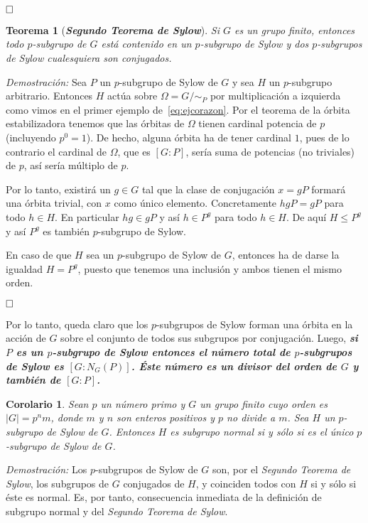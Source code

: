 \documentclass[12pt]{article}
\newtheorem{theorem}{Teorema}[section]
\newtheorem{corolario}{Corolario}[theorem]
\begin{document}
$\hfill \square$

\begin{theorem}[\textbf{\textit{Segundo Teorema de Sylow}}]Si $G$ es un grupo finito, entonces todo $p$-subgrupo de $G$ está contenido en un $p$-subgrupo de Sylow y dos $p$-subgrupos de Sylow cualesquiera son conjugados.

\end{theorem}
\emph{Demostración: }Sea $P$ un $p$-subgrupo de Sylow de $G$ y sea $H$ un $p$-subgrupo arbitrario. Entonces $H$ actúa sobre $\Omega= G/\sim_{P}$ por multiplicación a izquierda como vimos en el primer ejemplo de~\ref{eq:ejcorazon}. Por el teorema de la órbita estabilizadora tenemos que las órbitas de $\Omega$ tienen cardinal potencia de $p$ (incluyendo $p^{0}=1$). De hecho, alguna órbita ha de tener cardinal $1$, pues de lo contrario el cardinal de $\Omega$, que es $[G:P]$, sería suma de potencias (no triviales) de $p$, así sería múltiplo de $p$.

Por lo tanto, existirá un $g \in G$ tal que la clase de conjugación $x = gP$ formará una órbita trivial, con $x$ como único elemento. Concretamente $hgP = gP$ para todo $h \in H$. En particular $hg \in gP$ y así $h \in P^{g}$ para todo $h \in H$. De aquí $H \leq P^{g}$ y así $P^{g}$ es también $p$-subgrupo de Sylow.

En caso de que $H$ sea un $p$-subgrupo de Sylow de $G$, entonces ha de darse la igualdad $H = P^{g}$, puesto que tenemos una inclusión y ambos tienen el mismo orden.

$\hfill \square$

Por lo tanto, queda claro que los $p$-subgrupos de Sylow forman una órbita en la acción de $G$ sobre el conjunto de todos sus subgrupos por conjugación. Luego, \textbf{\textit{si $P$ es un $p$-subgrupo de Sylow entonces el número total de $p$-subgrupos de Sylow es $[G: N_{G}(P)]$. Éste número es un divisor del orden de $G$ y también de $[G:P]$.}}

\begin{corolario}Sean $p$ un número primo y $G$ un grupo finito cuyo orden es $|G| = p^{n}m$, donde $m$ y $n$ son enteros positivos y $p$ no divide a $m$. Sea $H$ un $p$-subgrupo de Sylow de $G$. Entonces $H$ es subgrupo normal si y sólo si es el único $p$-subgrupo de Sylow de $G$.
\end{corolario}
\emph{Demostración: }Los $p$-subgrupos de Sylow de $G$ son, por el \textit{Segundo Teorema de Sylow}, los subgrupos de $G$ conjugados de $H$, y coinciden todos con $H$ si y sólo si éste es normal. Es, por tanto, consecuencia inmediata de la definición de subgrupo normal y del \textit{Segundo Teorema de Sylow}.
\end{document}
